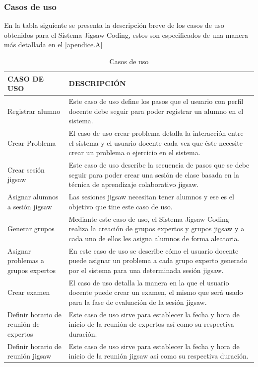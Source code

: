 \subsubsection{Casos de uso}
En la tabla siguiente se presenta la descripción breve de los casos de uso obtenidos para el Sistema Jigsaw Coding, estos son especificados de una manera más detallada en el \autoref{apendice.A}
\begin{longtable}{L{4cm}L{9cm}}
	\caption{Casos de uso}
	\label{tab:cap4_casosdeuso}\\
	\toprule[0.8mm]
	CASO DE USO & DESCRIPCIÓN \\
	\midrule[0.6mm]
	Registrar alumno & Este caso de uso define los pasos que el usuario con perfil docente debe seguir para poder registrar un alumno en el sistema.\\
	\midrule
	Crear Problema & El caso de uso crear problema detalla la interacción entre el sistema y el usuario docente cada vez que éste necesite crear un problema o ejercicio en el sistema.\\
	\midrule
	Crear sesión jigsaw & Este caso de uso describe la secuencia de pasos que se debe seguir para poder crear una sesión de clase basada en la técnica de aprendizaje colaborativo jigsaw.\\
	\midrule
	Asignar alumnos a sesión jigsaw & Las sesiones jigsaw necesitan tener alumnos y ese es el objetivo que tine este caso de uso.\\
	\midrule
	Generar grupos & Mediante este caso de uso, el Sistema Jigsaw Coding realiza la creación de grupos expertos y grupos jigsaw y a cada uno de ellos les asigna alumnos de forma aleatoria.\\
	\midrule
	Asignar problemas a grupos expertos & En este caso de uso se describe cómo el usuario docente puede asignar un problema a cada grupo experto generado por el sistema para una determinada sesión jigsaw.\\
	\midrule
	Crear examen & El caso de uso detalla la manera en la que el usuario docente puede crear un examen, el mismo que será usado para la fase de evaluación de la sesión jigsaw.\\
	\midrule
	Definir horario de reunión de expertos & Este caso de uso sirve para establecer la fecha y hora de inicio de la reunión de expertos así como su respectiva duración.\\
	\midrule
	Definir horario de reunión jigsaw & Este caso de uso sirve para establecer la fecha y hora de inicio de la reunión jigsaw así como su respectiva duración.\\

\end{longtable}
